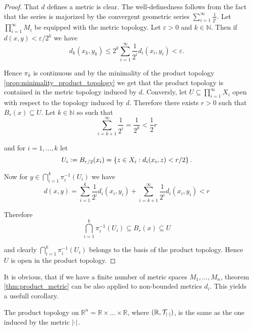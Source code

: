 \begin{proof}
	That $d$ defines a metric is clear. The well-definedness follows from the fact that the series is majorized by the convergent geometric series $\sum_{i = 1}^\infty \frac{1}{2^i}$. Let $\prod_{i = 1}^\infty M_i$ be equipped with the metric topology. Let $\varepsilon > 0$ and $k \in \mathbb{N}$. Then if $d(x,y) < \varepsilon/2^k$ we have 
	\begin{equation}
		d_k(x_k,y_k) \leq 2^k \sum_{i = 1}^\infty \frac{1}{2^i}d_i(x_i,y_i) < \varepsilon.
	\end{equation}

	Hence $\pi_k$ is continuous and by the minimality of the product topology \ref{prop:minimality_product_topology} we get that the product topology is contained in the metric topology induced by $d$. Conversly, let $U \subseteq \prod_{i = 1}^\infty X_i$ open with respect to the topology induced by $d$. Therefore there exists $r > 0$ such that $B_r(x) \subseteq U$. Let $k \in \mathbb{N}$ so such that
	\begin{equation}
		\sum_{i = k + 1}^\infty \frac{1}{2^i} = \frac{1}{2^k} < \frac{1}{2}r
	\end{equation}

	\noindent and for $i = 1,\dots,k$ let
	\begin{equation}
		U_i := B_{r/2}(x_i) = \cbr[0]{z \in X_i : d_i(x_i,z) < r/2}.
	\end{equation}

	Now for $y \in \bigcap_{i = 1}^k \pi_i^{-1}(U_i)$ we have
	\begin{equation}
		d(x,y) = \sum_{i = 1}^k \frac{1}{2^i}d_i(x_i,y_i) + \sum_{i = k + 1}^\infty \frac{1}{2^i}d_i(x_i,y_i) < r
	\end{equation}

	Therefore 
	\begin{equation}
		\bigcap_{i = 1}^k \pi_i^{-1}(U_i) \subseteq B_r(x) \subseteq U
	\end{equation}

	\noindent and clearly $\bigcap_{i = 1}^k \pi_i^{-1}(U_i)$ belongs to the basis of the product topology. Hence $U$ is open in the product topology.
\end{proof}

It is obvious, that if we have a finite number of metric spaces $M_1,\dots,M_n$, theorem \ref{thm:product_metric} can be also applied to non-bounded metrics $d_i$. This yields a usefull corollary.

\begin{corollary}
	The product topology on $\mathbb{R}^n = \mathbb{R} \times \dots \times \mathbb{R}$, where $(\mathbb{R},\mathcal{T}_{\abs[0]{\cdot}})$, is the same as the one induced by the metric $\abs[0]{\cdot}$.
	\label{prop:product_topology_Rn}
\end{corollary}

